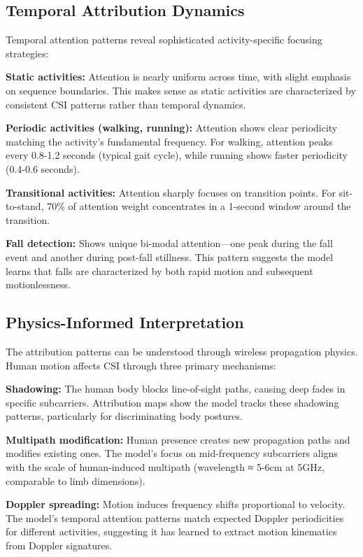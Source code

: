 \documentclass[lettersize,journal]{IEEEtran}
\begin{document}
\subsection{Temporal Attribution Dynamics}

Temporal attention patterns reveal sophisticated activity-specific focusing strategies:

\textbf{Static activities:} Attention is nearly uniform across time, with slight emphasis on sequence boundaries. This makes sense as static activities are characterized by consistent CSI patterns rather than temporal dynamics.

\textbf{Periodic activities (walking, running):} Attention shows clear periodicity matching the activity's fundamental frequency. For walking, attention peaks every 0.8-1.2 seconds (typical gait cycle), while running shows faster periodicity (0.4-0.6 seconds).

\textbf{Transitional activities:} Attention sharply focuses on transition points. For sit-to-stand, 70\% of attention weight concentrates in a 1-second window around the transition.

\textbf{Fall detection:} Shows unique bi-modal attention—one peak during the fall event and another during post-fall stillness. This pattern suggests the model learns that falls are characterized by both rapid motion and subsequent motionlessness.

\subsection{Physics-Informed Interpretation}

The attribution patterns can be understood through wireless propagation physics. Human motion affects CSI through three primary mechanisms:

\textbf{Shadowing:} The human body blocks line-of-sight paths, causing deep fades in specific subcarriers. Attribution maps show the model tracks these shadowing patterns, particularly for discriminating body postures.

\textbf{Multipath modification:} Human presence creates new propagation paths and modifies existing ones. The model's focus on mid-frequency subcarriers aligns with the scale of human-induced multipath (wavelength ≈ 5-6cm at 5GHz, comparable to limb dimensions).

\textbf{Doppler spreading:} Motion induces frequency shifts proportional to velocity. The model's temporal attention patterns match expected Doppler periodicities for different activities, suggesting it has learned to extract motion kinematics from Doppler signatures.
\end{document}
